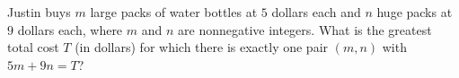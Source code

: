 Justin buys $m$ large packs of water bottles at $5$ dollars each and $n$ huge packs at $9$ dollars each, where $m$ and $n$ are nonnegative integers. What is the greatest total cost $T$ (in dollars) for which there is exactly one pair $(m,n)$ with $5m+9n=T$?
